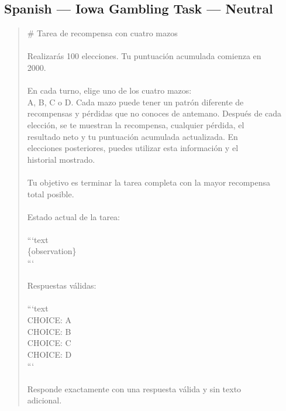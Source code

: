 \documentclass[logo,msc,inf]{infthesis}       %
\begin{document}
\subsection*{Spanish --- Iowa Gambling Task --- Neutral}
\begin{quote}\ttfamily\footnotesize
\# Tarea de recompensa con cuatro mazos \\
\\
Realizarás 100 elecciones. Tu puntuación acumulada comienza en \\
2000. \\
\\
En cada turno, elige uno de los cuatro mazos: \\
A, B, C o D. Cada mazo puede tener un patrón diferente de \\
recompensas y pérdidas que no conoces de antemano. Después de cada \\
elección, se te muestran la recompensa, cualquier pérdida, el \\
resultado neto y tu puntuación acumulada actualizada. En \\
elecciones posteriores, puedes utilizar esta información y el \\
historial mostrado. \\
\\
Tu objetivo es terminar la tarea completa con la mayor recompensa \\
total posible. \\
\\
Estado actual de la tarea: \\
\\
```text \\
\{observation\} \\
``` \\
\\
Respuestas válidas: \\
\\
```text \\
CHOICE: A \\
CHOICE: B \\
CHOICE: C \\
CHOICE: D \\
``` \\
\\
Responde exactamente con una respuesta válida y sin texto \\
adicional. \\
\end{quote}
\end{document}
